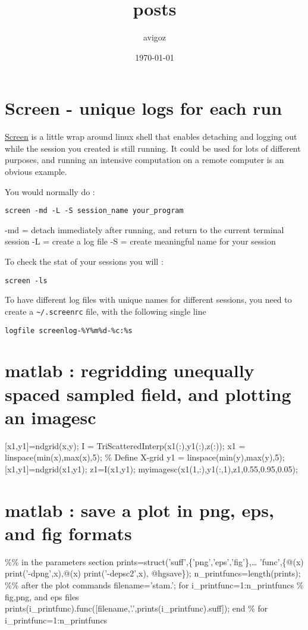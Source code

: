 \documentclass[11pt]{article}
\author{avigoz}
\date{\today}
\title{posts}
\begin{document}
\maketitle
\tableofcontents

\section{Screen - unique logs for each run}
\label{sec-1}

\href{https://wiki.archlinux.org/index.php/GNU_Screen}{Screen} is a little wrap around linux shell that enables detaching and logging out while the session you created is still running. It could be used for lots of different purposes, and running an intensive computation on a remote computer is an obvious example.

You would normally do :
\begin{verbatim}
screen -md -L -S session_name your_program
\end{verbatim}

-md = detach immediately after running, and return to the current terminal session
-L = create a log file
-S = create meaningful name for your session

To check the stat of your sessions you will :
\begin{verbatim}
screen -ls
\end{verbatim}

To have different log files with unique names for different sessions, you need to create a \texttt{\textasciitilde{}/.screenrc} file, with the following single line
\begin{verbatim}
logfile screenlog-%Y%m%d-%c:%s
\end{verbatim}



\section{matlab : regridding unequally spaced sampled field, and plotting an imagesc}
\label{sec-2}

[x1,y1]=ndgrid(x,y);
I = TriScatteredInterp(x1(:),y1(:),z(:));  
x1 = linspace(min(x),max(x),5);     \% Define X-grid
y1 = linspace(min(y),max(y),5);
[x1,y1]=ndgrid(x1,y1);
z1=I(x1,y1);
myimagesc(x1(1,:),y1(:,1),z1,0.55,0.95,0.05);
\section{matlab : save a plot in png, eps, and fig formats}
\label{sec-3}
\%\% in the parameters section
prints=struct('suff',\{'png','eps','fig'\},\ldots{}
              'func',\{@(x) print('-dpng',x),@(x) print('-depsc2',x), @hgsave\});
n\_printfuncs=length(prints);
\%\% after the plot commands
filename='stam.';
for i\_printfunc=1:n\_printfuncs \% fig,png, and eps files
    prints(i\_printfunc).func([filename,'.',prints(i\_printfunc).suff]);
end \% for i\_printfunc=1:n\_printfuncs
\end{document}
